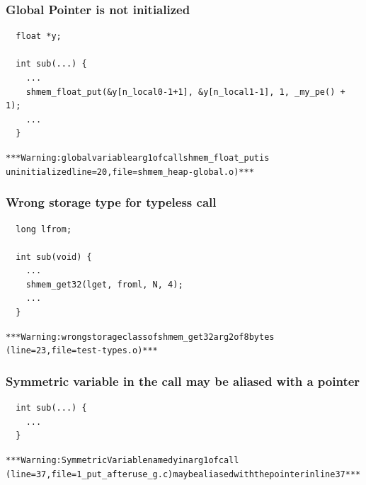 \subsubsection{Global Pointer is not initialized}

\begin{lstlisting}
  float *y;

  int sub(...) {
    ...
    shmem_float_put(&y[n_local0-1+1], &y[n_local1-1], 1, _my_pe() + 1);
    ...
  }
\end{lstlisting}
\begin{alltt}
  *** \openshmem Warning: global variable arg1 of call shmem_float_put is 
  uninitialized line=20, file=shmem_heap-global.o) ***
\end{alltt}

\subsubsection{Wrong storage type for typeless \openshmem call}

\begin{lstlisting}
  long lfrom;

  int sub(void) {
    ...
    shmem_get32(lget, froml, N, 4);
    ...
  }
\end{lstlisting}
\begin{alltt}
  *** \openshmem Warning: wrong storage class of shmem_get32 arg2 of 8 bytes 
  (line=23, file=test-types.o) ***
\end{alltt}

\subsubsection{Symmetric variable in the \openshmem call may be aliased with a pointer}

\begin{lstlisting}
  int sub(...) {
    ...
  }
\end{lstlisting}
\begin{alltt}
  *** \openshmem Warning: Symmetric Variable named y in arg1 of \openshmem call 
  (line=37, file=1_put_afteruse_g.c) may be aliased with the pointer in line 37***
\end{alltt}
